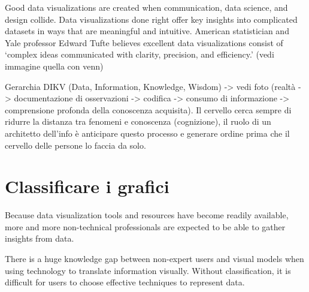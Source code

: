 Good data visualizations are created when communication, data science, and design collide. Data visualizations done right offer key insights into complicated datasets in ways that are meaningful and intuitive. American statistician and Yale professor Edward Tufte believes excellent data visualizations consist of ‘complex ideas communicated with clarity, precision, and efficiency.'
(vedi immagine quella con venn)

Gerarchia DIKV (Data, Information, Knowledge, Wisdom) -> vedi foto (realtà -> documentazione di osservazioni -> codifica -> consumo di informazione -> comprensione profonda della conoscenza acquisita). Il cervello cerca sempre di ridurre la distanza tra fenomeni e conoscenza (cognizione), il ruolo di un architetto dell'info è anticipare questo processo e generare ordine prima che il cervello delle persone lo faccia da solo.


\section{Classificare i grafici}
Because data visualization tools and resources have become readily available, more and more non-technical professionals are expected to be able to gather insights from data.

There is a huge knowledge gap between non-expert
users and visual models when using technology to
translate information visually. Without classification,
it is difficult for users to choose effective techniques
to represent data.





